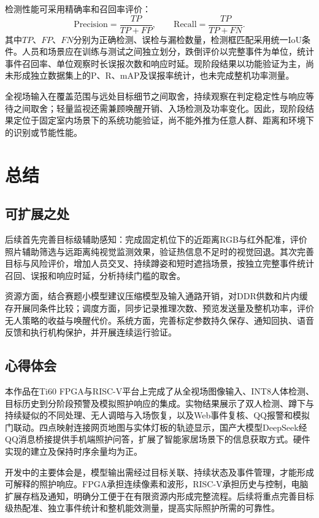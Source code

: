 \documentclass[UTF8,a4paper,zihao=-4,fontset=none,scheme=plain]{ctexart}
\begin{document}
检测性能可采用精确率和召回率评价：
\begin{equation}
 \mathrm{Precision}=\frac{TP}{TP+FP},\qquad
 \mathrm{Recall}=\frac{TP}{TP+FN}.
 \label{eq:metrics}
\end{equation}
其中$TP$、$FP$、$FN$分别为正确检测、误检与漏检数量，检测框匹配采用统一IoU条件。人员和场景应在训练与测试之间独立划分，跌倒评价以完整事件为单位，统计事件召回率、单位观察时长误报次数和响应时延。现阶段结果以功能验证为主，尚未形成独立数据集上的P、R、mAP及误报率统计，也未完成整机功率测量。

全视场输入在覆盖范围与远处目标细节之间取舍，持续观察在判定稳定性与响应等待之间取舍；轻量监视还需兼顾唤醒开销、入场检测及功率变化。因此，现阶段结果定位于固定室内场景下的系统功能验证，尚不能外推为任意人群、距离和环境下的识别或节能性能。

\FloatBarrier
\clearpage
\section{总结}
\subsection{可扩展之处}
后续首先完善目标级辅助感知：完成固定机位下的近距离RGB与红外配准，评价照片辅助筛选与远距离纯视觉监测效果，验证热信息不足时的视觉回退。其次完善目标与风险评价，增加人员交叉、持续蹲姿和短时遮挡场景，按独立完整事件统计召回、误报和响应时延，分析持续门槛的取舍。

资源方面，结合赛题小模型建议\cite{guide}压缩模型及输入通路开销，对DDR供数和片内缓存开展同条件比较；调度方面，同步记录推理次数、预览发送量及整机功率，评价无人策略的收益与唤醒代价。系统方面，完善标定参数持久保存、通知回执、语音反馈和执行机构保护，并开展连续运行验证。

\subsection{心得体会}
本作品在Ti60 FPGA与RISC-V平台上完成了从全视场图像输入、INT8人体检测、目标历史到分阶段预警及模拟照护响应的集成。实物结果展示了双人检测、蹲下与持续疑似的不同处理、无人调暗与入场恢复，以及Web事件复核、QQ报警和模拟门联动。四点映射连接网页地图与实体灯板的轨迹显示，国产大模型DeepSeek经QQ消息桥接提供手机端照护问答，扩展了智能家居场景下的信息获取方式。硬件实现的建立及保持时序余量均为正。

开发中的主要体会是，模型输出需经过目标关联、持续状态及事件管理，才能形成可解释的照护响应。FPGA承担连续像素和波形，RISC-V承担历史与控制，电脑扩展存档及通知，明确分工便于在有限资源内形成完整流程。后续将重点完善目标级热配准、独立事件统计和整机能效测量，提高实际照护所需的可靠性。
\end{document}
